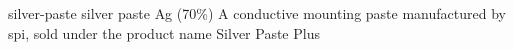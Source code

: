 \newglsXchemical%
{silver-paste}%
{silver paste}%
{Ag (70\%)}%
{A conductive mounting paste manufactured by \gls{spi}, sold under the product name Silver Paste Plus\texttrademark}%